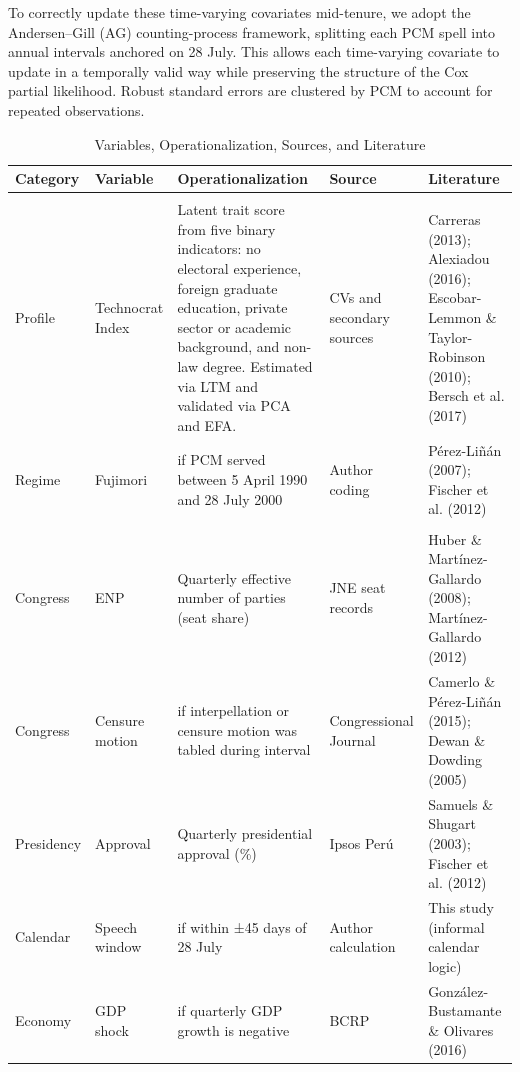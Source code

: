 \documentclass[a4paper, 12pt]{article}
\begin{document}
To correctly update these time-varying covariates mid-tenure, we adopt the Andersen–Gill (AG) counting-process framework, splitting each PCM spell into annual intervals anchored on 28 July. This allows each time-varying covariate to update in a temporally valid way while preserving the structure of the Cox partial likelihood. Robust standard errors are clustered by PCM to account for repeated observations.

\begin{table}
\scriptsize
\centering
\caption{Variables, Operationalization, Sources, and Literature}
\label{tab:variables}
\begin{tabular}{
  >{\raggedright\arraybackslash}p{3cm} 
  >{\raggedright\arraybackslash}p{3.5cm} 
  >{\raggedright\arraybackslash}p{6cm} 
  >{\raggedright\arraybackslash}p{2.5cm} 
  >{\raggedright\arraybackslash}p{4cm}
}
\toprule
\textbf{Category} & \textbf{Variable} & \textbf{Operationalization} & \textbf{Source} & \textbf{Literature} \\
\midrule

\multicolumn{5}{l}{\textit{Non–Time-Varying Covariates}} \\
\midrule

Profile & Technocrat Index & Latent trait score from five binary indicators: no electoral experience, foreign graduate education, private sector or academic background, and non-law degree. Estimated via LTM and validated via PCA and EFA. & CVs and secondary sources & Carreras (2013); Alexiadou (2016); Escobar-Lemmon \& Taylor-Robinson (2010); Bersch et al. (2017) \\

Regime & Fujimori & 1 if PCM served between 5 April 1990 and 28 July 2000 & Author coding & Pérez-Liñán (2007); Fischer et al. (2012) \\

\midrule
\multicolumn{5}{l}{\textit{Time–Varying Covariates}} \\
\midrule

Congress & ENP & Quarterly effective number of parties (seat share) & JNE seat records & Huber \& Martínez-Gallardo (2008); Martínez-Gallardo (2012) \\

Congress & Censure motion & 1 if interpellation or censure motion was tabled during interval & Congressional Journal & Camerlo \& Pérez-Liñán (2015); Dewan \& Dowding (2005) \\

Presidency & Approval & Quarterly presidential approval (\%) & Ipsos Perú & Samuels \& Shugart (2003); Fischer et al. (2012) \\

Calendar & Speech window & 1 if within ±45 days of 28 July & Author calculation & This study (informal calendar logic) \\

Economy & GDP shock & 1 if quarterly GDP growth is negative & BCRP & González-Bustamante \& Olivares (2016) \\

\bottomrule
\end{tabular}
\end{table}
\end{document}
